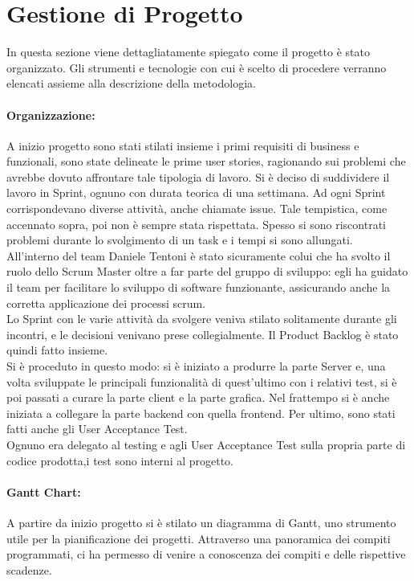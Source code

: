 \section{Gestione di Progetto}
In questa sezione viene dettagliatamente spiegato come il progetto è stato organizzato. Gli strumenti e tecnologie con cui è scelto di procedere verranno elencati assieme alla descrizione della metodologia.
    \paragraph{Organizzazione: }
    A inizio progetto sono stati stilati insieme i primi requisiti di business e funzionali, sono state delineate le prime user stories, ragionando sui problemi che avrebbe dovuto affrontare tale tipologia di lavoro.
   Si è deciso di suddividere il lavoro in Sprint, ognuno con durata teorica di una settimana. Ad ogni Sprint corrispondevano diverse attività, anche chiamate issue. Tale tempistica, come accennato sopra, poi non è sempre stata rispettata. Spesso si sono riscontrati problemi durante lo svolgimento di un task e i tempi si sono allungati.\\
    All'interno del team Daniele Tentoni è stato sicuramente colui che ha svolto il ruolo dello Scrum Master oltre a far parte del gruppo di sviluppo: egli ha guidato il team per facilitare lo sviluppo di software funzionante, assicurando anche la corretta applicazione dei processi scrum.\\
    Lo Sprint con le varie attività da svolgere veniva stilato solitamente durante gli incontri, e le decisioni venivano prese collegialmente. Il Product Backlog è stato quindi fatto insieme.\\ 
    Si è proceduto in questo modo: si è iniziato a produrre la parte Server e, una volta sviluppate le principali funzionalità di quest'ultimo con i relativi test, si è poi passati a curare la parte client e la parte grafica. Nel frattempo si è anche iniziata a collegare la parte backend con quella frontend. Per ultimo, sono stati fatti anche gli User Acceptance Test.\\
    Ognuno era delegato al testing e agli User Acceptance Test sulla propria parte di codice prodotta,i test sono interni al progetto. 
    
    
    
    \paragraph{Gantt Chart: } 
    A partire da inizio progetto si è stilato un diagramma di Gantt, uno strumento utile per la pianificazione dei progetti. Attraverso una panoramica dei compiti programmati, ci ha permesso di venire a conoscenza dei compiti e delle rispettive scadenze.
    

